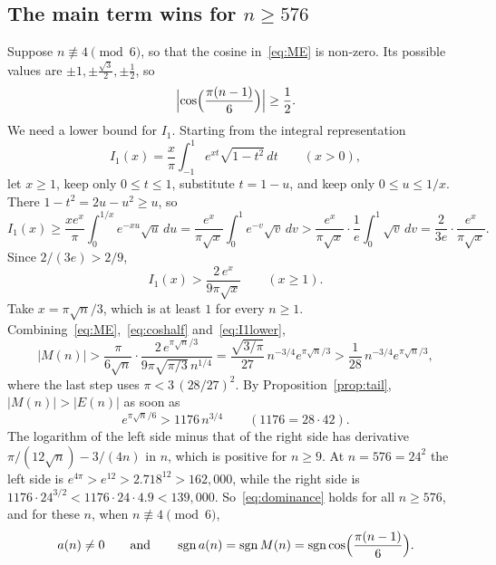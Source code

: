 \documentclass[11pt]{amsart}
\numberwithin{equation}{section}
\theoremstyle{definition}
\theoremstyle{remark}
\newcommand{\sgn}{\operatorname{sgn}}
\begin{document}
\subsection{The main term wins for \texorpdfstring{$n\ge576$}{n >= 576}}
Suppose $n\not\equiv4\pmod6$, so that the cosine in~\eqref{eq:ME} is non-zero. Its possible values are $\pm1,\pm\frac{\sqrt3}2,\pm\frac12$, so
\begin{equation}\label{eq:coshalf}
\Bigl|\cos\Bigl(\frac{\pi(n-1)}6\Bigr)\Bigr|\ge\frac12.
\end{equation}
We need a lower bound for $I_1$. Starting from the integral representation~\cite[\S4.12]{AAR}
\begin{equation}\label{eq:I1int}
I_1(x)=\frac x\pi\int_{-1}^1e^{xt}\sqrt{1-t^2}\,dt\qquad(x>0),
\end{equation}
let $x\ge1$, keep only $0\le t\le1$, substitute $t=1-u$, and keep only $0\le u\le1/x$. There $1-t^2=2u-u^2\ge u$, so
\[
I_1(x)\ge\frac{x e^x}{\pi}\int_0^{1/x}e^{-xu}\sqrt u\,du=\frac{e^x}{\pi\sqrt x}\int_0^1e^{-v}\sqrt v\,dv
>\frac{e^x}{\pi\sqrt x}\cdot\frac1e\int_0^1\sqrt v\,dv=\frac{2}{3e}\cdot\frac{e^x}{\pi\sqrt x}.
\]
Since $2/(3e)>2/9$,
\begin{equation}\label{eq:I1lower}
I_1(x)>\frac{2\,e^x}{9\pi\sqrt x}\qquad(x\ge1).
\end{equation}
Take $x=\pi\sqrt n/3$, which is at least $1$ for every $n\ge1$. Combining~\eqref{eq:ME},~\eqref{eq:coshalf} and~\eqref{eq:I1lower},
\[
|M(n)|>\frac{\pi}{6\sqrt n}\cdot\frac{2\,e^{\pi\sqrt n/3}}{9\pi\sqrt{\pi/3}\,n^{1/4}}=\frac{\sqrt{3/\pi}}{27}\,n^{-3/4}e^{\pi\sqrt n/3}>\frac1{28}\,n^{-3/4}e^{\pi\sqrt n/3},
\]
where the last step uses $\pi<3\,(28/27)^2$. By Proposition~\ref{prop:tail}, $|M(n)|>|E(n)|$ as soon as
\begin{equation}\label{eq:dominance}
e^{\pi\sqrt n/6}>1176\,n^{3/4}\qquad(1176=28\cdot42).
\end{equation}
The logarithm of the left side minus that of the right side has derivative $\pi/(12\sqrt n)-3/(4n)$ in $n$, which is positive for $n\ge9$. At $n=576=24^2$ the left side is $e^{4\pi}>e^{12}>2.718^{12}>162{,}000$, while the right side is $1176\cdot24^{3/2}<1176\cdot24\cdot4.9<139{,}000$. So~\eqref{eq:dominance} holds for all $n\ge576$, and for these $n$, when $n\not\equiv4\pmod 6$,
\begin{equation}\label{eq:signlarge}
a(n)\neq0\qquad\text{and}\qquad\sgn a(n)=\sgn M(n)=\sgn\cos\Bigl(\frac{\pi(n-1)}6\Bigr).
\end{equation}
\end{document}
